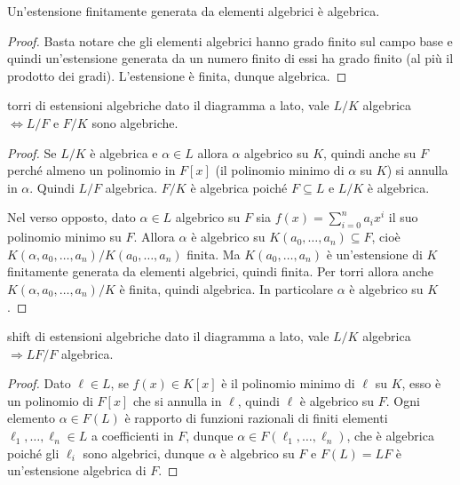 \vspace{0.5cm}

\begin{proposition2}
    Un'estensione finitamente generata da elementi algebrici è algebrica.
\end{proposition2}
\begin{proof}
    Basta notare che gli elementi algebrici hanno grado finito sul campo base e quindi un'estensione generata da un numero finito di essi ha grado finito (al più il prodotto dei gradi). L'estensione è finita, dunque algebrica.
\end{proof}

\begin{minipage}{0.9\textwidth}  
\begin{theorem}{torri di estensioni algebriche}
    dato il diagramma a lato, vale $L/K$ algebrica $\iff L/F$ e $F/K$ sono algebriche.
\end{theorem}
\end{minipage}\hfill
\begin{minipage}{0.1\textwidth}  
\end{minipage}\hfill
\begin{proof}
    Se $L/K$ è algebrica e $\alpha \in L$ allora $\alpha$ algebrico su $K$, quindi anche su $F$ perché almeno un polinomio in $F[x]$ (il polinomio minimo di $\alpha$ su $K$) si annulla in $\alpha$. Quindi $L/F$ algebrica. $F/K$ è algebrica poiché $F \subseteq L$ e $L/K$ è algebrica.
    
    Nel verso opposto, dato $\alpha \in L$ algebrico su $F$ sia $f(x) = \sum_{i=0}^n a_ix^i$ il suo polinomio minimo su $F$. Allora $\alpha$ è algebrico su $K(a_0,\dots, a_n) \subseteq F$, cioè $K(\alpha, a_0, \dots, a_n)/K(a_0, \dots, a_n)$ finita. Ma $K(a_0,\dots, a_n)$ è un'estensione di $K$ finitamente generata da elementi algebrici, quindi finita. Per torri allora anche $K(\alpha, a_0, \dots, a_n)/K$ è finita, quindi algebrica. In particolare $\alpha$ è algebrico su $K$.
\end{proof}
\begin{minipage}{0.7\textwidth}
\begin{theorem}{shift di estensioni algebriche}
    dato il diagramma a lato, vale $L/K$ algebrica $\Rightarrow LF/F$ algebrica.
\end{theorem}
\begin{proof}
    Dato $\ell \in L$, se $f(x) \in K[x]$ è il polinomio minimo di $\ell$ su $K$, esso è un polinomio di $F[x]$ che si annulla in $\ell$, quindi $\ell$ è algebrico su $F$. Ogni elemento $\alpha \in F(L)$ è rapporto di funzioni razionali di finiti elementi $\ell_1, \dots, \ell_n \in L$ a coefficienti in $F$, dunque $\alpha \in F(\ell_1, \dots, \ell_n)$, che è algebrica poiché gli $\ell_i$ sono algebrici, dunque $\alpha$ è algebrico su $F$ e $F(L) = LF$ è un'estensione algebrica di $F$.
\end{proof}
\end{minipage}\hfill
